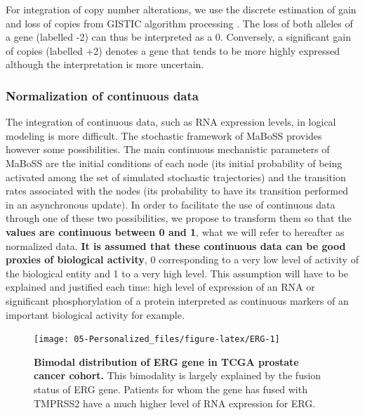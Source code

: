 \documentclass[a4paper,12pt,twoside,onecolumn,openright,final,oldfontcommands]{memoir}
\begin{document}
For integration of copy number alterations, we use the discrete
estimation of gain and loss of copies from GISTIC algorithm processing
\citep{mermel2011gistic}. The loss of both alleles of a gene (labelled
-2) can thus be interpreted as a 0. Conversely, a significant gain of
copies (labelled +2) denotes a gene that tends to be more highly
expressed although the interpretation is more uncertain.

\subsubsection{Normalization of continuous
data}\label{normalization-of-continuous-data}

The integration of continuous data, such as RNA expression levels, in
logical modeling is more difficult. The stochastic framework of MaBoSS
provides however some possibilities. The main continuous mechanistic
parameters of MaBoSS are the initial conditions of each node (its
initial probability of being activated among the set of simulated
stochastic trajectories) and the transition rates associated with the
nodes (its probability to have its transition performed in an
asynchronous update). In order to facilitate the use of continuous data
through one of these two possibilities, we propose to transform them so
that the \textbf{values are continuous between 0 and 1}, what we will
refer to hereafter as normalized data. \textbf{It is assumed that these
continuous data can be good proxies of biological activity}, 0
corresponding to a very low level of activity of the biological entity
and 1 to a very high level. This assumption will have to be explained
and justified each time: high level of expression of an RNA or
significant phosphorylation of a protein interpreted as continuous
markers of an important biological activity for example.

\begin{figure}

{\centering \texttt{[image: 05-Personalized\_files/figure-latex/ERG-1]} 

}

\caption[Bimodal distribution of ERG gene in TCGA prostate cancer cohort]{\textbf{Bimodal distribution of ERG gene in TCGA
prostate cancer cohort.} This bimodality is largely explained by the
fusion status of ERG gene. Patients for whom the gene has fused with
TMPRSS2 have a much higher level of RNA expression for ERG.}\label{fig:ERG}
\end{figure}
\end{document}
